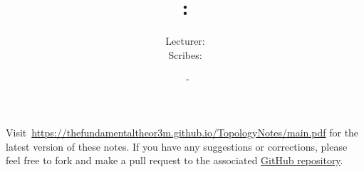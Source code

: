 \documentclass[a4paper, 12pt, openany, oneside]{book}
\title{\vspace{-2em}\COURSENUMBER: \COURSENAME}
\author{Lecturer: \LECTURER \\ Scribes: \SCRIBE}
\date{\UNIVERSITY\ - \TERM}
\begin{document}
\setlength{\abovedisplayskip}{7.5pt}  %
\setlength{\belowdisplayskip}{7.5pt}  %
\setlength{\abovedisplayshortskip}{2pt}
\setlength{\belowdisplayshortskip}{2pt}

\maketitle
\thispagestyle{empty}

\tableofcontents
\thispagestyle{empty}

\newpage

\nocite{*}




% 

\newpage




\printbibliography[prenote=mybibnote]
\thispagestyle{empty}

Visit~\url{https://thefundamentaltheor3m.github.io/TopologyNotes/main.pdf} for the latest version of these notes. If you have any suggestions or corrections, please feel free to fork and make a pull request to the associated \href{https://github.com/thefundamentaltheor3m/TopologyNotes}{GitHub repository}.
\end{document}

